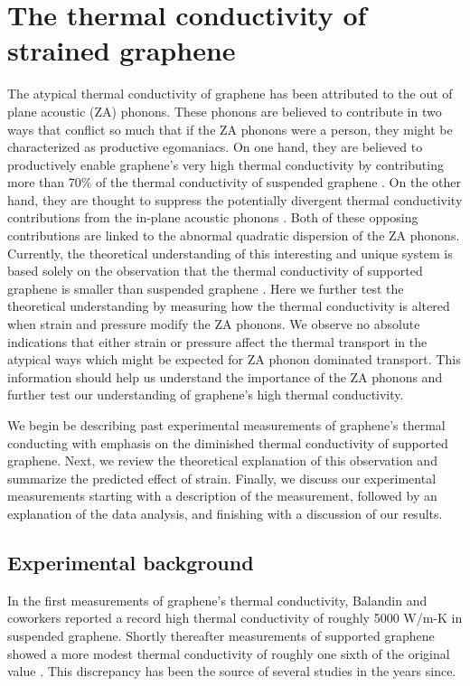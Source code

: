 \chapter{The thermal conductivity of strained graphene \label{chap:therm}}
The atypical thermal conductivity of graphene has been attributed to the out of plane acoustic (ZA) phonons.
These phonons are believed to contribute in two ways that conflict so much that if the ZA phonons were a person, they might be characterized as productive egomaniacs.
On one hand, they are believed to productively enable graphene's very high thermal conductivity by contributing more than 70\% of the thermal conductivity of suspended graphene \cite{Lindsay2010}.
On the other hand, they are thought to suppress the potentially divergent thermal conductivity contributions from the in-plane acoustic phonons \cite{Pereira2013,Bonini2012}.
Both of these opposing contributions are linked to the abnormal quadratic dispersion of the ZA phonons.
Currently, the theoretical understanding of this interesting and unique system is based solely on the observation that the thermal conductivity of supported graphene is smaller than suspended graphene \cite{Lindsay2010}.
Here we further test the theoretical understanding by measuring how the thermal conductivity is altered when strain and pressure modify the ZA phonons.
We observe no absolute indications that either strain or pressure affect the thermal transport in the atypical ways which might be expected for ZA phonon dominated transport.
This information should help us understand the importance of the ZA phonons and further test our understanding of graphene's high thermal conductivity.

We begin be describing past experimental measurements of graphene's thermal conducting with emphasis on the diminished thermal conductivity of supported graphene.
Next, we review the theoretical explanation of this observation and summarize the predicted effect of strain.
Finally, we discuss our experimental measurements starting with a description of the measurement, followed by an explanation of the data analysis, and finishing with a discussion of our results.

\section{Experimental background \label{sec:therm:Exp}}
In the first measurements of graphene's thermal conductivity, Balandin and coworkers reported a record high thermal conductivity of roughly 5000 W/m-K \cite{Balandin2008} in suspended graphene.
Shortly thereafter measurements of supported graphene showed a more modest thermal conductivity of roughly one sixth of the original value \cite{Seol2010}.
This discrepancy has been the source of several studies in the years since.

